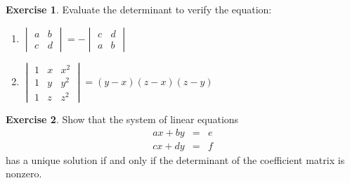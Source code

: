 \documentclass[handout]{beamer}
\newcommand{\fn}{\insertframenumber}
\theoremstyle{definition}
\newtheorem{exercise}{Exercise}
\begin{document}
\begin{frame}{\fn}
	\begin{exercise}
		Evaluate the determinant to verify the equation:
		\begin{enumerate}[label=(\alph*)]
			\item $\begin{vmatrix}a&b\\c&d\end{vmatrix}=-\begin{vmatrix}c&d\\a&b\end{vmatrix}$
			\item $\begin{vmatrix}
				1&x&x^2\\1&y&y^2\\1&z&z^2
			\end{vmatrix}=(y-x)(z-x)(z-y)$
	\end{enumerate}
	\end{exercise}
\end{frame}
\begin{frame}{\fn}
	\begin{exercise}
		Show that the system of linear equations
			$$\begin{array}{rcl}
				ax+by&=&e\\
				cx+dy&=&f
			\end{array}$$
		has a unique solution if and only if the determinant of the coefficient matrix is nonzero.
	\end{exercise}
\end{frame}
\end{document}
